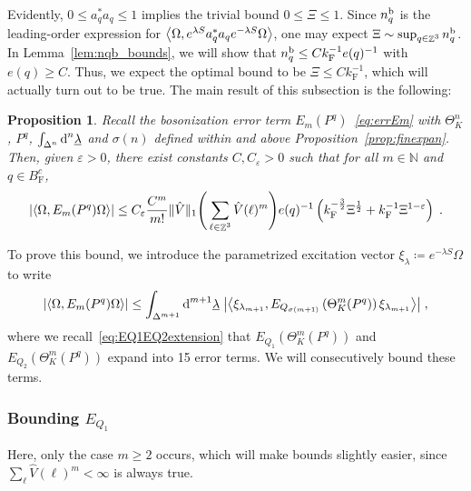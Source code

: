 \documentclass[12pt,a4paper]{article}
\numberwithin{equation}{section}
\newcommand{\NNN}{\mathbb{N}}
\newcommand{\ulambda}{\underline{\lambda}}
\newcommand{\1}{\mathbb{I}}
\renewcommand{\b}{\textnormal{b}}
\newcommand{\di}{\textnormal{d}}
\newcommand{\F}{\mathrm{F}}
\DeclareMathOperator{\Z}{\mathbb{Z}}
\newcommand{\half}{\frac{1}{2}}
\newcommand{\eva}[1]{\left\langle #1 \right\rangle}
\theoremstyle{plain}
\newtheorem{proposition}[theorem]{Proposition}
\theoremstyle{definition}
\theoremstyle{remark}
\theoremstyle{plain}
\theoremstyle{definition}
\theoremstyle{remark}
\begin{document}
Evidently, $ 0 \le a_q^* a_q \le 1 $ implies the trivial bound $ 0 \le \Xi \le 1 $. \textcolor{green!30!black}{Since $ n_q^{\b} $ is the leading-order expression for $ \expval{\Omega, e^{\lambda S} a^*_q a_q e^{-\lambda S} \Omega} $, one may expect $ \Xi \sim \sup_{q \in \Z^3} n_q^{\b} $. In Lemma~\ref{lem:nqb_bounds}, we will show that $ n_q^{\b} \le  C k_{\F}^{-1} e(q)^{-1} $ with $ e(q) \ge C $. Thus, we expect the optimal bound to be $ \Xi \le C k_{\F}^{-1} $, which will actually turn out to be true.}
The main result of this subsection is the following:

\begin{proposition} \label{prop:finalEmest}
Recall the bosonization error term $E_m(P^q)$~\eqref{eq:errEm} with $ \Theta^n_K $, $ P^q $, $ \int_{\Delta^n} \di^n \ulambda $ and $ \sigma(n) $ defined within and above Proposition~\ref{prop:finexpan}. Then, given $ \varepsilon > 0 $, there exist constants $ C, C_\varepsilon > 0 $ such that for all $ m \in \NNN $ and $ q \in B_{\F}^c $,
\begin{equation} \label{eq:finalEmest}
	\abs{\eva{\Omega, E_m(P^q) \Omega}}
	\leq C_\varepsilon \frac{C^m}{m!} \Vert \hat{V} \Vert_1
		\Bigg( \sum_{\ell \in \Z^3} \hat{V}(\ell)^m \Bigg)
		e(q)^{-1} \left( k_{\F}^{-\frac{3}{2}} \Xi^\half
		+ k_{\F}^{-1}\Xi^{1-\varepsilon} \right) \;.
\end{equation}
\end{proposition}
To prove this bound, we introduce the parametrized excitation vector $ \xi_\lambda \coloneq e^{- \lambda S} \Omega $ to write
\begin{equation} \label{eq:errEm2}
	\abs{\eva{\Omega, E_m(P^q) \Omega }}
	\le \int_{\Delta^{m+1}} \di^{m+1} \underline{\lambda} \;
		\abs{\eva{\xi_{\lambda_{m+1}}, E_{Q_{\sigma(m+1)}}\left(\Theta^{m}_{K}(P^q)\right) \xi_{\lambda_{m+1}}}} \;,
\end{equation}
where we recall~\eqref{eq:EQ1EQ2extension} that $ E_{Q_1}\left(\Theta^m_{K}(P^q)\right) $ and $ E_{Q_2}\left(\Theta^m_{K}(P^q)\right) $ expand into 15 error terms. We will consecutively bound these terms.



\subsubsection{Bounding $E_{Q_1}$}

\textcolor{green!30!black}{Here, only the case $ m \ge 2 $ occurs, which will make bounds slightly easier, since $ \sum_\ell \hat{V}(\ell)^m < \infty $ is always true.}
\end{document}
